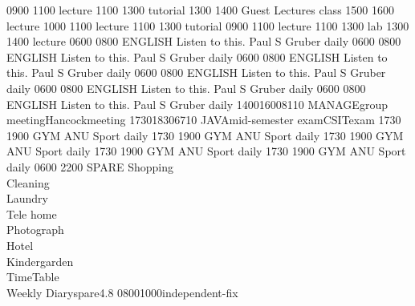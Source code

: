 \documentclass[a3paper,10pt]{report}
\begin{document}
\begin{landscape}
\begin{multicols}{2}
\begin{center}
\begin{timetable}
   {0900} {1100} {\COMPA{}}  {\COMPAa{}}  {\COMPAba{}}  {lecture} 
   {1100} {1300} {\COMPB{}}  {\COMPBt{}}  {\COMPBbc{}}  {tutorial} 
   {1300} {1400} {\COMPD{}} {Guest Lectures} {\COMPDbc{}} {class} 
   {1500} {1600} {\COMPB{}} {\COMPBa{}} {\COMPBba{}} {lecture} 
   {1000} {1100} {\COMPD{}} {\COMPDa{}}  {\COMPDba{}}  {lecture} 
   {1100} {1300} {\COMPD{}} {\COMPDt{}} {\COMPDbb{}} {tutorial} 
   {0900} {1100} {\COMPB{}} {\COMPBa{}} {\COMPBbb{}} {lecture} 
   {1100} {1300} {\COMPA{}} {\COMPAt{}} {\COMPAbc{}} {lab} 
   {1300} {1400} {\COMPA{}} {\COMPAa{}} {\COMPAbb{}} {lecture} 
   {0600} {0800} {ENGLISH} {Listen to this. Paul S Gruber}{} {daily}
   {0600} {0800} {ENGLISH} {Listen to this. Paul S Gruber}{}  {daily}
   {0600} {0800} {ENGLISH} {Listen to this. Paul S Gruber}{}  {daily}
   {0600} {0800} {ENGLISH} {Listen to this. Paul S Gruber}{}  {daily}
   {0600} {0800} {ENGLISH} {Listen to this. Paul S Gruber}{}  {daily}
   {0600} {0800} {ENGLISH} {Listen to this. Paul S Gruber}{}  {daily}
   {1400}{1600}{8110 MANAGE}{group meeting}{Hancock}{meeting}
   {1730}{1830}{6710 JAVA}{mid-semester exam}{CSIT}{exam}
   {1730} {1900} {GYM} {}{ANU Sport} {daily}
   {1730} {1900} {GYM} {}{ANU Sport}  {daily}
   {1730} {1900} {GYM} {}{ANU Sport}  {daily}
   {1730} {1900} {GYM} {}{ANU Sport}  {daily}
   {1730} {1900} {GYM} {}{ANU Sport}  {daily}
   {0600} {2200} {SPARE} {Shopping\\Cleaning\\Laundry\\Tele
    home\\Photograph\\Hotel\\Kindergarden\\TimeTable\\Weekly Diary}{}{spare}{4.8}
   {0800}{1000}{\COMPC{}}{\COMPCa{}}{\COMPCba{}}{independent-fix}

\end{timetable}
\end{center}
\end{multicols}
\end{landscape}
\end{document}
